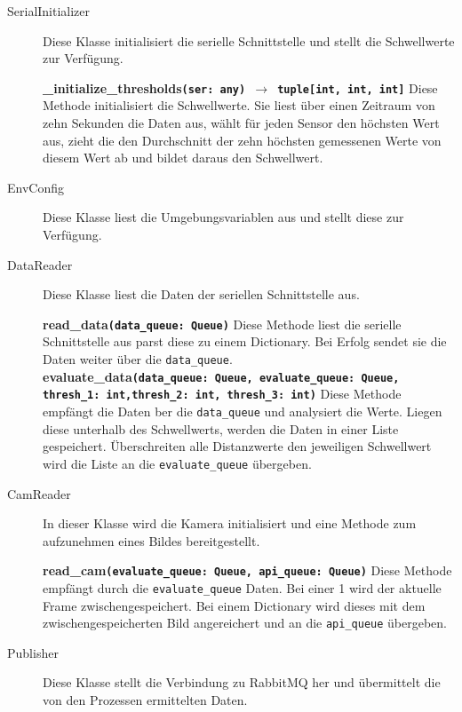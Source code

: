 \begin{description}
  \item[SerialInitializer] Diese Klasse initialisiert die serielle Schnittstelle und stellt die Schwellwerte zur Verfügung.
    \begin{addmargin}{0.2cm}
      \textbf{\_initialize\_thresholds\texttt{(ser: any) $\rightarrow$ tuple[int, int, int]}} Diese Methode initialisiert die Schwellwerte. Sie liest über einen Zeitraum von zehn Sekunden die Daten aus, wählt für jeden Sensor den höchsten Wert aus, zieht die den Durchschnitt der zehn höchsten gemessenen Werte von diesem Wert ab und bildet daraus den Schwellwert. \\
    \end{addmargin}
  \item[EnvConfig] Diese Klasse liest die Umgebungsvariablen aus und stellt diese zur Verfügung.
  \item[DataReader] Diese Klasse liest die Daten der seriellen Schnittstelle aus.
    \begin{addmargin}{0.2cm}
      \textbf{read\_data\texttt{(data\_queue: Queue)}} Diese Methode liest die serielle Schnittstelle aus parst diese zu einem Dictionary. Bei Erfolg sendet sie die Daten weiter über die \linebreak\texttt{data\_queue}. \\
      \textbf{evaluate\_data\texttt{(data\_queue: Queue, evaluate\_queue: Queue, thresh\_1: int,}\linebreak \texttt{thresh\_2: int, thresh\_3: int)}} Diese Methode empfängt die Daten ber die \linebreak\texttt{data\_queue} und analysiert die Werte. Liegen diese unterhalb des Schwellwerts, werden die Daten in einer Liste gespeichert. Überschreiten alle Distanzwerte den jeweiligen Schwellwert wird die Liste an die \texttt{evaluate\_queue} übergeben.
    \end{addmargin}
  \item[CamReader] In dieser Klasse wird die Kamera initialisiert und eine Methode zum aufzunehmen eines Bildes bereitgestellt.
    \begin{addmargin}{0.2cm}
      \textbf{read\_cam\texttt{(evaluate\_queue: Queue, api\_queue: Queue)}} Diese Methode empfängt durch die \texttt{evaluate\_queue} Daten. Bei einer 1 wird der aktuelle Frame zwischengespeichert. Bei einem Dictionary wird dieses mit dem zwischengespeicherten Bild angereichert und an die \texttt{api\_queue} übergeben.
    \end{addmargin}
  \item[Publisher] Diese Klasse stellt die Verbindung zu RabbitMQ her und übermittelt die von den Prozessen ermittelten Daten.
\end{description}


